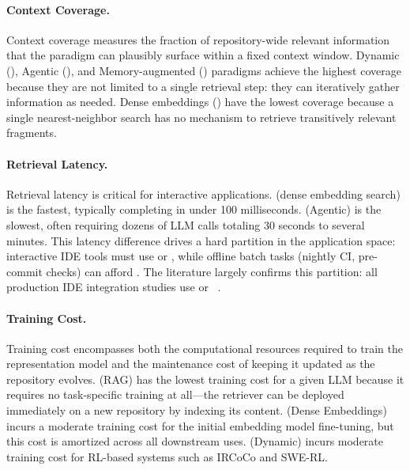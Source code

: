 \paragraph{Context Coverage.}
Context coverage measures the fraction of repository-wide relevant information that the
paradigm can plausibly surface within a fixed context window. Dynamic (), Agentic
(), and Memory-augmented () paradigms achieve the highest coverage because
they are not limited to a single retrieval step: they can iteratively gather information as
needed. Dense embeddings () have the lowest coverage because a single nearest-neighbor
search has no mechanism to retrieve transitively relevant fragments.

\paragraph{Retrieval Latency.}
Retrieval latency is critical for interactive applications.  (dense embedding search)
is the fastest, typically completing in under 100 milliseconds.  (Agentic) is the
slowest, often requiring dozens of LLM calls totaling 30 seconds to several minutes. This
latency difference drives a hard partition in the application space: interactive IDE tools
must use  or , while offline batch tasks (nightly CI, pre-commit checks)
can afford . The literature largely confirms this partition: all production IDE
integration studies use  or ~\cite{yang2025deepdive, deng2025enhancing,
li2024enhancing}.

\paragraph{Training Cost.}
Training cost encompasses both the computational resources required to train the representation
model and the maintenance cost of keeping it updated as the repository evolves. 
(RAG) has the lowest training cost for a given LLM because it requires no task-specific
training at all---the retriever can be deployed immediately on a new repository by indexing
its content.  (Dense Embeddings) incurs a moderate training cost for the initial
embedding model fine-tuning, but this cost is amortized across all downstream uses. 
(Dynamic) incurs moderate training cost for RL-based systems such as IRCoCo and SWE-RL.

